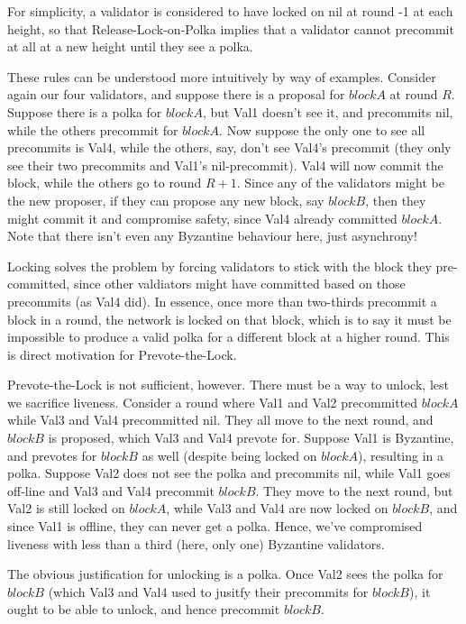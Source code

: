For simplicity, a validator is considered to have locked on nil at round -1 at each height, so that Release-Lock-on-Polka implies that a validator cannot precommit at all at a new height until they see a polka.

These rules can be understood more intuitively by way of examples. 
Consider again our four validators, and suppose there is a proposal for $blockA$ at round $R$. 
Suppose there is a polka for $blockA$, but Val1 doesn't see it, and precommits nil, while the others precommit for $blockA$.
Now suppose the only one to see all precommits is Val4, while the others, say, don't see Val4's precommit (they only see their two precommits and Val1's nil-precommit).
Val4 will now commit the block, while the others go to round $R+1$.
Since any of the validators might be the new proposer, if they can propose any new block, say $blockB$, then they might commit it and compromise safety, since Val4 already committed $blockA$.
Note that there isn't even any Byzantine behaviour here, just asynchrony!

Locking solves the problem by forcing validators to stick with the block they pre-committed, since other valdiators might have committed based on those precommits (as Val4 did).
In essence, once more than two-thirds precommit a block in a round, the network is locked on that block,
which is to say it must be impossible to produce a valid polka for a different block at a higher round.
This is direct motivation for Prevote-the-Lock.

Prevote-the-Lock is not sufficient, however. There must be a way to unlock, lest we sacrifice liveness.
Consider a round where Val1 and Val2 precommitted $blockA$ while Val3 and Val4 precommitted nil.
They all move to the next round, and $blockB$ is proposed, which Val3 and Val4 prevote for.
Suppose Val1 is Byzantine, and prevotes for $blockB$ as well (despite being locked on $blockA$), resulting in a polka.
Suppose Val2 does not see the polka and precommits nil, while Val1 goes off-line and Val3 and Val4 precommit $blockB$. 
They move to the next round, but Val2 is still locked on $blockA$, while Val3 and Val4 are now locked on $blockB$, 
and since Val1 is offline, they can never get a polka. Hence, we've compromised liveness with less than a third (here, only one) Byzantine validators.

The obvious justification for unlocking is a polka. Once Val2 sees the polka for $blockB$ (which Val3 and Val4 used to jusitfy their precommits for $blockB$), 
it ought to be able to unlock, and hence precommit $blockB$.

